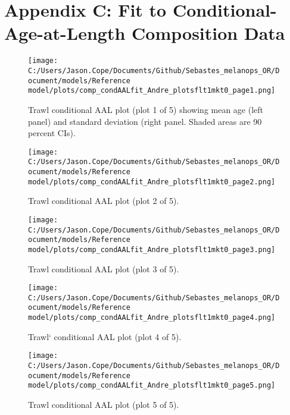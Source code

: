 \documentclass[11pt,
  english,
  letterpaper,
]{article}
\begin{document}
\clearpage

\hypertarget{app-c}{%
\section{Appendix C: Fit to Conditional-Age-at-Length Composition Data}\label{app-c}}

\begin{figure}
\centering
\texttt{[image: C:/Users/Jason.Cope/Documents/Github/Sebastes\_melanops\_OR/Document/models/Reference model/plots/comp\_condAALfit\_Andre\_plotsflt1mkt0\_page1.png]}
\caption{Trawl conditional AAL plot (plot 1 of 5) showing mean age (left panel) and standard deviation (right panel. Shaded areas are 90 percent CIs).\label{fig:comp_condAALfit_Andre_plotsflt1mkt0_page1}}
\end{figure}

\begin{figure}
\centering
\texttt{[image: C:/Users/Jason.Cope/Documents/Github/Sebastes\_melanops\_OR/Document/models/Reference model/plots/comp\_condAALfit\_Andre\_plotsflt1mkt0\_page2.png]}
\caption{Trawl conditional AAL plot (plot 2 of 5).\label{fig:comp_condAALfit_Andre_plotsflt1mkt0_page2}}
\end{figure}

\begin{figure}
\centering
\texttt{[image: C:/Users/Jason.Cope/Documents/Github/Sebastes\_melanops\_OR/Document/models/Reference model/plots/comp\_condAALfit\_Andre\_plotsflt1mkt0\_page3.png]}
\caption{Trawl conditional AAL plot (plot 3 of 5).\label{fig:comp_condAALfit_Andre_plotsflt1mkt0_page3}}
\end{figure}

\begin{figure}
\centering
\texttt{[image: C:/Users/Jason.Cope/Documents/Github/Sebastes\_melanops\_OR/Document/models/Reference model/plots/comp\_condAALfit\_Andre\_plotsflt1mkt0\_page4.png]}
\caption{Trawl` conditional AAL plot (plot 4 of 5).\label{fig:comp_condAALfit_Andre_plotsflt1mkt0_page4}}
\end{figure}

\begin{figure}
\centering
\texttt{[image: C:/Users/Jason.Cope/Documents/Github/Sebastes\_melanops\_OR/Document/models/Reference model/plots/comp\_condAALfit\_Andre\_plotsflt1mkt0\_page5.png]}
\caption{Trawl conditional AAL plot (plot 5 of 5).\label{fig:comp_condAALfit_Andre_plotsflt1mkt0_page5}}
\end{figure}
\end{document}

